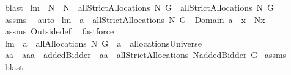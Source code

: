 \begin{isabellebody}
%
\isadelimproof
%
\endisadelimproof
%
\isatagproof
{}\isamarkupfalse%
\ blast%
\endisatagproof
{\isafoldproof}%
%
\isadelimproof
\isanewline
%
\endisadelimproof
{}\isamarkupfalse%
\ lm{}{}{\isacharcolon}\ \ {\isachardoublequoteopen}N{}\ {\isasymsubseteq}\ N{}{\isachardoublequoteclose}\ \ {\isachardoublequoteopen}allStrictAllocations{\isacharprime}{\isacharprime}{\isacharprime}\ N{}\ G\ {\isasymsubseteq}\ allStrictAllocations{\isacharprime}{\isacharprime}{\isacharprime}\ N{}\ G{\isachardoublequoteclose}\ \isanewline
%
\isadelimproof
%
\endisadelimproof
%
\isatagproof
{}\isamarkupfalse%
\ assms\ \isamarkupfalse%
\ auto%
\endisatagproof
{\isafoldproof}%
%
\isadelimproof
\isanewline
%
\endisadelimproof
{}\isamarkupfalse%
\ lm{}{}{\isacharcolon}\ \ {\isachardoublequoteopen}a\ {\isasymin}\ allStrictAllocations{\isacharprime}{\isacharprime}{\isacharprime}\ N\ G{\isachardoublequoteclose}\ \ {\isachardoublequoteopen}Domain\ {\isacharparenleft}a\ {\isacharminus}{\isacharminus}\ x{\isacharparenright}\ {\isasymsubseteq}\ N{\isacharminus}{\isacharbraceleft}x{\isacharbraceright}{\isachardoublequoteclose}\ \isanewline
%
\isadelimproof
%
\endisadelimproof
%
\isatagproof
{}\isamarkupfalse%
\ assms\ Outside{\isacharunderscore}def\ \isamarkupfalse%
\ fastforce%
\endisatagproof
{\isafoldproof}%
%
\isadelimproof
\isanewline
%
\endisadelimproof
{}\isamarkupfalse%
\ lm{}{}{\isacharcolon}\ \ {\isachardoublequoteopen}a\ {\isasymin}\ allAllocations{\isacharprime}\ N\ G{\isachardoublequoteclose}\ \ {\isachardoublequoteopen}a\ {\isasymin}\ allocationsUniverse{\isachardoublequoteclose}\isanewline
%
\isadelimproof
%
\endisadelimproof
%
\isatagproof
{}\isamarkupfalse%
\ {\isacharminus}\isanewline
{}\isamarkupfalse%
\ aa\ \ {\isachardoublequoteopen}a{\isacharequal}aa\ {\isacharminus}{\isacharminus}\ addedBidder{\isacharprime}\ {\isacharampersand}\ aa\ {\isasymin}\ allStrictAllocations{\isacharprime}\ {\isacharparenleft}N{\isasymunion}{\isacharbraceleft}addedBidder{\isacharprime}{\isacharbraceright}{\isacharparenright}\ G{\isachardoublequoteclose}\isanewline
{}\isamarkupfalse%
\ assms\ \isamarkupfalse%
\ blast\isanewline
{}\isamarkupfalse%

\end{isabellebody}
